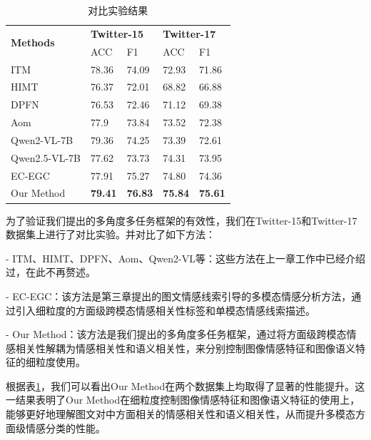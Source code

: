\begin{table}[t]
\centering
\caption{\label{four:mainresult}
    对比实验结果
    }
\begin{tabular}{l|llll}
\toprule
\multirow{2}{*}{\textbf{Methods}} & \multicolumn{2}{l}{\textbf{Twitter-15}} & \multicolumn{2}{l}{\textbf{Twitter-17}} \\
   & ACC                 & F1                 & ACC                 & F1                 \\ \hline
ITM                               & 78.36               & 74.09              & 72.93               & 71.86              \\
HIMT                              & 76.37               & 72.01              & 68.82               & 66.88              \\
DPFN                              & 76.53               & 72.46              & 71.12               & 69.38              \\
Aom                               & 77.9                & 73.84              & 73.52               & 72.38              \\
Qwen2-VL-7B                       & 79.36               & 74.25              & 73.39               & 72.61              \\
Qwen2.5-VL-7B                     & 77.62               & 73.73              & 74.31               & 73.95              \\
\hline
EC-EGC        &  77.91        & 75.27             & 74.80   & 74.36         \\ 
Our Method        &  \textbf{79.41}       & \textbf{76.83}              & \textbf{75.84}                & \textbf{75.61}              \\ 
\bottomrule
\end{tabular}%
\end{table}

为了验证我们提出的多角度多任务框架的有效性，我们在Twitter-15和Twitter-17数据集上进行了对比实验。并对比了如下方法：

- ITM、HIMT、DPFN、Aom、Qwen2-VL等：这些方法在上一章工作中已经介绍过，在此不再赘述。

- EC-EGC：该方法是第三章提出的图文情感线索引导的多模态情感分析方法，通过引入细粒度的方面级跨模态情感相关性标签和单模态情感线索描述。

- Our Method：该方法是我们提出的多角度多任务框架，通过将方面级跨模态情感相关性解耦为情感相关性和语义相关性，来分别控制图像情感特征和图像语义特征的细粒度使用。

根据表\ref{four:mainresult}，我们可以看出Our Method在两个数据集上均取得了显著的性能提升。这一结果表明了Our Method在细粒度控制图像情感特征和图像语义特征的使用上，能够更好地理解图文对中方面相关的情感相关性和语义相关性，从而提升多模态方面级情感分类的性能。


